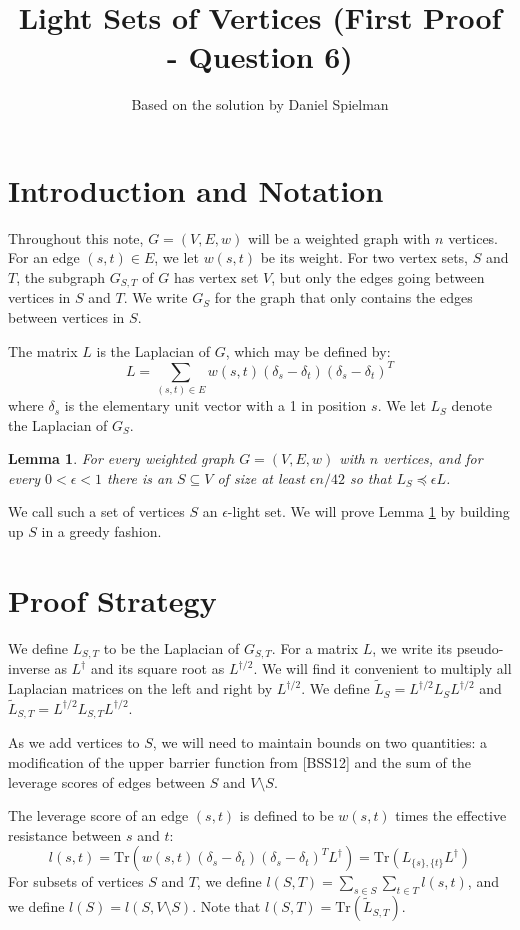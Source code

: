 \documentclass[12pt]{article}
\title{Light Sets of Vertices (First Proof - Question 6)}
\author{Based on the solution by Daniel Spielman}
\date{}
\newtheorem{lemma}{Lemma}
\begin{document}
\maketitle

\section{Introduction and Notation}
Throughout this note, $G = (V,E,w)$ will be a weighted graph with $n$ vertices. For an edge $(s,t) \in E$, we let $w(s,t)$ be its weight. For two vertex sets, $S$ and $T$, the subgraph $G_{S,T}$ of $G$ has vertex set $V$, but only the edges going between vertices in $S$ and $T$. We write $G_S$ for the graph that only contains the edges between vertices in $S$.

The matrix $L$ is the Laplacian of $G$, which may be defined by:
\[
L = \sum_{(s,t) \in E} w(s,t)(\delta_s - \delta_t)(\delta_s - \delta_t)^T
\]
where $\delta_s$ is the elementary unit vector with a 1 in position $s$. We let $L_S$ denote the Laplacian of $G_S$. 

\begin{lemma} \label{lem:main}
For every weighted graph $G=(V,E,w)$ with $n$ vertices, and for every $0 < \epsilon < 1$ there is an $S \subseteq V$ of size at least $\epsilon n/42$ so that $L_S \preceq \epsilon L$.
\end{lemma}

We call such a set of vertices $S$ an $\epsilon$-light set. We will prove Lemma \ref{lem:main} by building up $S$ in a greedy fashion. 

\section{Proof Strategy}
We define $L_{S,T}$ to be the Laplacian of $G_{S,T}$. For a matrix $L$, we write its pseudo-inverse as $L^{\dagger}$ and its square root as $L^{\dagger/2}$. We will find it convenient to multiply all Laplacian matrices on the left and right by $L^{\dagger/2}$. We define $\tilde{L}_S = L^{\dagger/2} L_S L^{\dagger/2}$ and $\tilde{L}_{S,T} = L^{\dagger/2} L_{S,T} L^{\dagger/2}$. 

As we add vertices to $S$, we will need to maintain bounds on two quantities: a modification of the upper barrier function from [BSS12] and the sum of the leverage scores of edges between $S$ and $V \setminus S$.

The leverage score of an edge $(s,t)$ is defined to be $w(s,t)$ times the effective resistance between $s$ and $t$:
\[
l(s,t) = \text{Tr}(w(s,t)(\delta_s - \delta_t)(\delta_s - \delta_t)^T L^{\dagger}) = \text{Tr}(L_{\{s\},\{t\}} L^{\dagger})
\]
For subsets of vertices $S$ and $T$, we define $l(S,T) = \sum_{s \in S} \sum_{t \in T} l(s,t)$, and we define $l(S) = l(S, V \setminus S)$. Note that $l(S,T) = \text{Tr}(\tilde{L}_{S,T})$.
\end{document}

